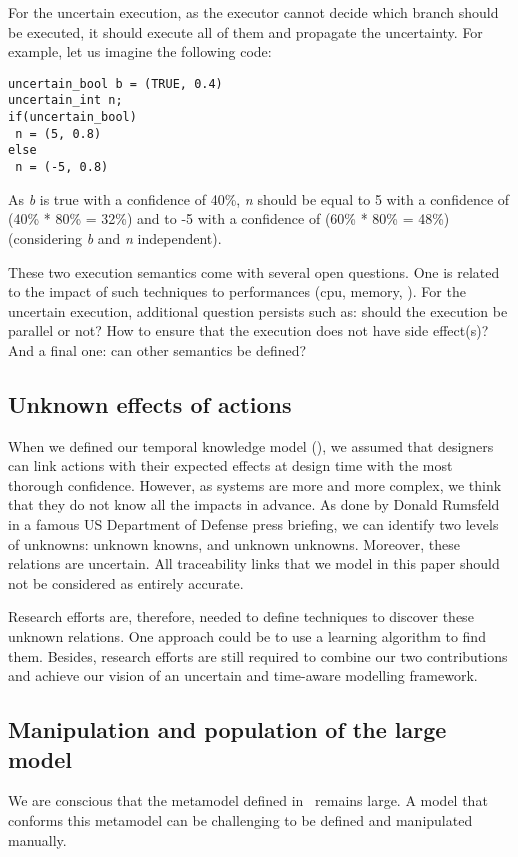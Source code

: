 For the uncertain execution, as the executor cannot decide which branch should be executed, it should execute all of them and propagate the uncertainty.
For example, let us imagine the following code:

\begin{lstlisting}[style=javaStyle, caption=Example for uncertain control flow]
uncertain_bool b = (TRUE, 0.4)
uncertain_int n;
if(uncertain_bool)
 n = (5, 0.8)
else
 n = (-5, 0.8)
\end{lstlisting}
As \textit{b} is true with a confidence of 40\%, \textit{n} should be equal to 5 with a confidence of (40\% * 80\% = 32\%) and to -5 with a confidence of (60\% * 80\% = 48\%) (considering \textit{b} and \textit{n} independent).

These two execution semantics come with several open questions.
One is related to the impact of such techniques to performances (\gls{cpu}, memory, \etc).
For the uncertain execution, additional question persists such as: should the execution be parallel or not? How to ensure that the execution does not have side effect(s)?
And a final one: can other semantics be defined?

\subsection{Unknown effects of actions}
When we defined our temporal knowledge model (\cf {}), we assumed that designers can link \glspl{action} with their expected effects at design time with the most thorough confidence. 
However, as systems are more and more complex, we think that they do not know all the impacts in advance.
As done by Donald Rumsfeld in a famous US Department of Defense press briefing, we can identify two levels of unknowns: unknown knowns, and unknown unknowns.
Moreover, these relations are uncertain.
All traceability links that we model in this paper should not be considered as entirely accurate.

Research efforts are, therefore, needed to define techniques to discover these unknown relations.
One approach could be to use a learning algorithm to find them.
Besides, research efforts are still required to combine our two contributions and achieve our vision of an uncertain and time-aware modelling framework.

\subsection{Manipulation and population of the large model}
We are conscious that the \gls{metamodel} defined in~ remains large.
A \gls{model} that conforms this \gls{metamodel} can be challenging to be defined and manipulated manually.

